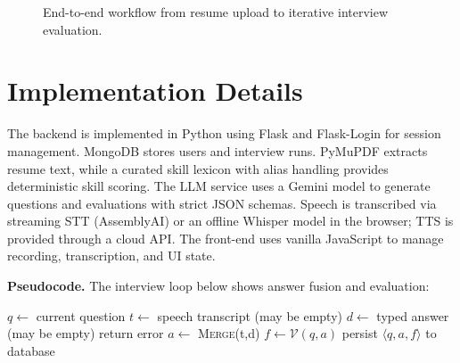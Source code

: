 \documentclass[conference]{IEEEtran}
\begin{document}
\begin{figure}[htbp]
\centering
{}
\caption{End-to-end workflow from resume upload to iterative interview evaluation.}
\label{fig:workflow}
\end{figure}

\section{Implementation Details}
The backend is implemented in Python using Flask and Flask-Login for session management. MongoDB stores users and interview runs. PyMuPDF extracts resume text, while a curated skill lexicon with alias handling provides deterministic skill scoring. The LLM service uses a Gemini model to generate questions and evaluations with strict JSON schemas. Speech is transcribed via streaming STT (AssemblyAI) or an offline Whisper model in the browser; TTS is provided through a cloud API. The front-end uses vanilla JavaScript to manage recording, transcription, and UI state.

\textbf{Pseudocode.} The interview loop below shows answer fusion and evaluation:

\begin{algorithmic}[1]
\STATE $q \leftarrow$ current question
\STATE $t \leftarrow$ speech transcript (may be empty)
\STATE $d \leftarrow$ typed answer (may be empty)
  \STATE return error
\ENDIF
\STATE $a \leftarrow$ \textsc{Merge}(t,d)
\STATE $f \leftarrow \mathcal{V}(q, a)$
\STATE persist $\langle q,a,f \rangle$ to database
\end{algorithmic}
\end{document}
